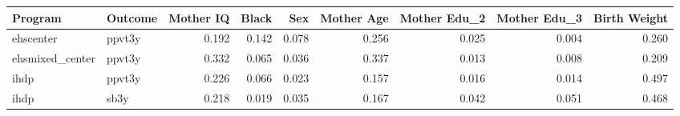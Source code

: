 \begin{table}[ht]
\centering
\begin{tabular}{llrrrrrrr}
  \hline
Program & Outcome & Mother IQ & Black & Sex & Mother Age & Mother Edu\_2 & Mother Edu\_3 & Birth Weight \\ 
  \hline
ehscenter & ppvt3y & 0.192 & 0.142 & 0.078 & 0.256 & 0.025 & 0.004 & 0.260 \\ 
  ehsmixed\_center & ppvt3y & 0.332 & 0.065 & 0.036 & 0.337 & 0.013 & 0.008 & 0.209 \\ 
  ihdp & ppvt3y & 0.226 & 0.066 & 0.023 & 0.157 & 0.016 & 0.014 & 0.497 \\ 
  ihdp & sb3y & 0.218 & 0.019 & 0.035 & 0.167 & 0.042 & 0.051 & 0.468 \\ 
   \hline
\end{tabular}
\end{table}
